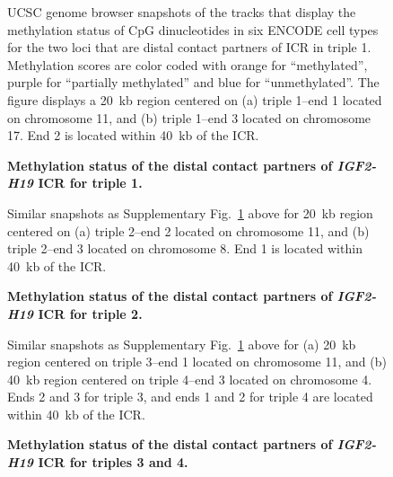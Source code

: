 \begin{figure}
\begin{center}
  \hspace{0.01\textwidth}
\end{center}
\caption{\bf Methylation status of the distal contact partners of \emph{IGF2-H19} ICR for triple 1.}
{UCSC genome browser snapshots of the tracks that display the methylation
    status of CpG dinucleotides in six ENCODE cell types for the two loci
    that are distal contact partners of ICR in triple 1. Methylation scores
    are color coded with orange for ``methylated'', purple for ``partially methylated''
    and blue for ``unmethylated''. The figure displays a 20~kb region centered on
    (a) triple 1--end 1 located on chromosome 11, and
    (b) triple 1--end 3 located on chromosome 17.
    End 2 is located within 40~kb of the ICR.
}
\label{suppfig:triple1methyl}
\end{figure}
\clearpage

\begin{figure}
\begin{center}
  \hspace{0.01\textwidth}
\end{center}
\caption{\bf Methylation status of the distal contact partners of \emph{IGF2-H19} ICR for triple 2.}
{Similar snapshots as Supplementary Fig.~\ref{suppfig:triple1methyl} above for 20~kb
    region centered on (a) triple 2--end 2 located on chromosome 11, and
    (b) triple 2--end 3 located on chromosome 8.
    End 1 is located within 40~kb of the ICR.
}
\label{suppfig:triple2methyl}
\end{figure}
\clearpage

\begin{figure}
\begin{center}
  \hspace{0.01\textwidth}
\end{center}
\caption{\bf Methylation status of the distal contact partners of \emph{IGF2-H19} ICR for triples 3 and 4.}
{Similar snapshots as Supplementary Fig.~\ref{suppfig:triple1methyl} above for (a) 20~kb
    region centered on triple 3--end 1 located on chromosome 11, and
    (b) 40~kb region centered on triple 4--end 3 located on chromosome 4.
    Ends 2 and 3 for triple 3, and ends 1 and 2 for triple 4 are located within 40~kb of the ICR.
}
\label{suppfig:triple3methyl}
\end{figure}
\clearpage

